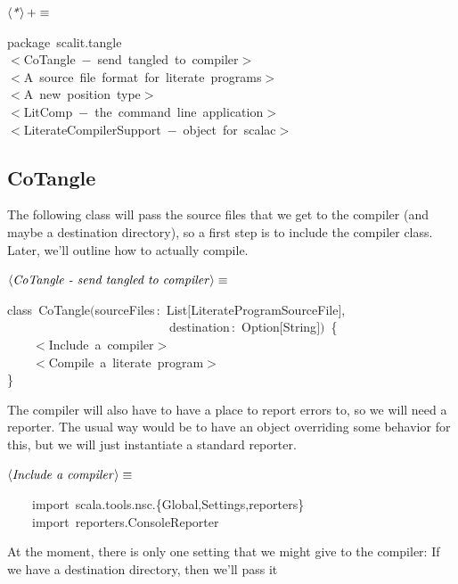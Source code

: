 \documentclass[a4paper,12pt]{article}
\begin{document}
$\left<\mbox{\emph{*}}\right>+\equiv$
\begin{program}{\vem package}~scalit.tangle
\\[0.5em]$<$CoTangle~$-$~send~tangled~to~compiler$>$
\\[0.5em]$<$A~source~file~format~{\vem for}~literate~programs$>$
\\[0.5em]$<$A~{\vem new}~position~{\vem type}$>$
\\[0.5em]$<$LitComp~$-$~the~command~line~application$>$
\\[0.5em]$<$LiterateCompilerSupport~$-$~{\vem object}~{\vem for}~scalac$>$
\\[0.5em]\end{program}
\subsection{CoTangle}
The following class will pass the source files that we get to the compiler (and
maybe a destination directory),
so a first step is to include the compiler class. Later, we'll outline
how to actually compile.

$\left<\mbox{\emph{CoTangle - send tangled to compiler}}\right>\equiv$
\begin{program}{\vem class}~CoTangle$($sourceFiles\,{\rm :}~List$[$LiterateProgramSourceFile$]$,
\\~~~~~~~~~~~~~~~~~~~~~~~~~~destination\,{\rm :}~Option$[$String$]$$)$~{\small\{}
\\~~~~$<$Include~a~compiler$>$
\\~~~~$<$Compile~a~literate~program$>$
\\{\small\}}
\\[0.5em]\end{program}
The compiler will also have to have a place to report errors to,
so we will need a reporter. The usual way would be to have an object
overriding some behavior for this, but we will just instantiate a
standard reporter.

$\left<\mbox{\emph{Include a compiler}}\right>\equiv$
\begin{program}~~~~{\vem import}~scala.tools.nsc.{\small\{}Global,Settings,reporters{\small\}}
\\~~~~{\vem import}~reporters.ConsoleReporter
\\[0.5em]\end{program}
At the moment, there is only one setting that we might give to the compiler:
If we have a destination directory, then we'll pass it
\end{document}
